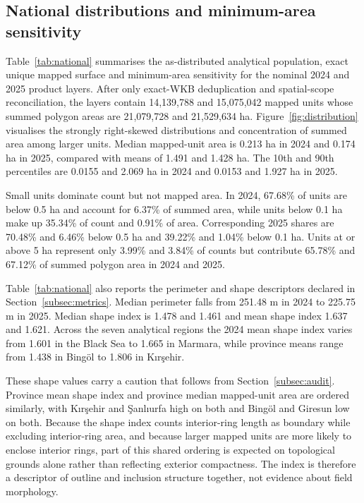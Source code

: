 \documentclass[pdflatex,sn-basic]{sn-jnl}
\begin{document}
\subsection{National distributions and minimum-area sensitivity}\label{subsec:national}

Table~\ref{tab:national} summarises the as-distributed analytical population, exact unique mapped surface and minimum-area sensitivity for the nominal 2024 and 2025 product layers. After only exact-WKB deduplication and spatial-scope reconciliation, the layers contain 14,139,788 and 15,075,042 mapped units whose summed polygon areas are 21,079,728 and 21,529,634 ha. Figure~\ref{fig:distribution} visualises the strongly right-skewed distributions and concentration of summed area among larger units. Median mapped-unit area is 0.213 ha in 2024 and 0.174 ha in 2025, compared with means of 1.491 and 1.428 ha. The 10th and 90th percentiles are 0.0155 and 2.069 ha in 2024 and 0.0153 and 1.927 ha in 2025.

Small units dominate count but not mapped area. In 2024, 67.68\% of units are below 0.5 ha and account for 6.37\% of summed area, while units below 0.1 ha make up 35.34\% of count and 0.91\% of area. Corresponding 2025 shares are 70.48\% and 6.46\% below 0.5 ha and 39.22\% and 1.04\% below 0.1 ha. Units at or above 5 ha represent only 3.99\% and 3.84\% of counts but contribute 65.78\% and 67.12\% of summed polygon area in 2024 and 2025.

Table~\ref{tab:national} also reports the perimeter and shape descriptors declared in Section~\ref{subsec:metrics}. Median perimeter falls from 251.48 m in 2024 to 225.75 m in 2025. Median shape index is 1.478 and 1.461 and mean shape index 1.637 and 1.621. Across the seven analytical regions the 2024 mean shape index varies from 1.601 in the Black Sea to 1.665 in Marmara, while province means range from 1.438 in Bingöl to 1.806 in Kırşehir.

These shape values carry a caution that follows from Section~\ref{subsec:audit}. Province mean shape index and province median mapped-unit area are ordered similarly, with Kırşehir and Şanlıurfa high on both and Bingöl and Giresun low on both. Because the shape index counts interior-ring length as boundary while excluding interior-ring area, and because larger mapped units are more likely to enclose interior rings, part of this shared ordering is expected on topological grounds alone rather than reflecting exterior compactness. The index is therefore a descriptor of outline and inclusion structure together, not evidence about field morphology.
\end{document}
